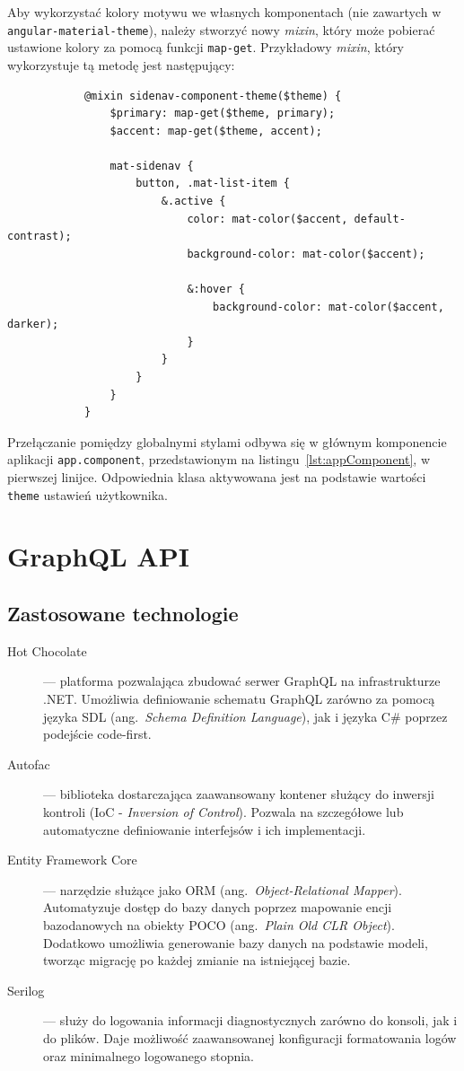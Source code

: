 		Aby wykorzystać kolory motywu we własnych komponentach (nie zawartych w \verb|angular-material-theme|),
		należy stworzyć nowy \emph{mixin}, który może pobierać ustawione kolory za pomocą funkcji \verb|map-get|.
		Przykładowy \emph{mixin}, który wykorzystuje tą metodę jest następujący:
		\begin{lstlisting}
			@mixin sidenav-component-theme($theme) {
				$primary: map-get($theme, primary);
				$accent: map-get($theme, accent);
			
				mat-sidenav {
					button, .mat-list-item {
						&.active {
							color: mat-color($accent, default-contrast);
							background-color: mat-color($accent);
			
							&:hover {
								background-color: mat-color($accent, darker);
							}
						}
					}
				}
			}			
		\end{lstlisting}

		Przełączanie pomiędzy globalnymi stylami odbywa się w głównym komponencie aplikacji \verb|app.component|,
		przedstawionym na listingu~\ref{lst:appComponent}, w pierwszej linijce.
		Odpowiednia klasa aktywowana jest na podstawie wartości \verb|theme| ustawień użytkownika.

\section{GraphQL API}
	\subsection{Zastosowane technologie}
		\begin{description}
			\item[Hot Chocolate] --- platforma pozwalająca zbudować serwer GraphQL na infrastrukturze .NET.
				Umożliwia definiowanie schematu GraphQL zarówno za pomocą języka SDL (ang.\ \emph{Schema Definition Language}),
				jak i języka C\# poprzez podejście code-first. 
			\item[Autofac] --- biblioteka dostarczająca zaawansowany kontener służący do inwersji kontroli (IoC - \emph{Inversion of Control}).
				Pozwala na szczegółowe lub automatyczne definiowanie interfejsów i ich implementacji.
			\item[Entity Framework Core] --- narzędzie służące jako ORM (ang.\ \emph{Object-Relational Mapper}).
				Automatyzuje dostęp do bazy danych poprzez mapowanie encji bazodanowych na obiekty POCO (ang.\ \emph{Plain Old CLR Object}).
				Dodatkowo umożliwia generowanie bazy danych na podstawie modeli, tworząc migrację po każdej zmianie na istniejącej bazie.
			\item[Serilog] --- służy do logowania informacji diagnostycznych zarówno do konsoli, jak i do plików.
				Daje możliwość zaawansowanej konfiguracji formatowania logów oraz minimalnego logowanego stopnia.
		\end{description}

